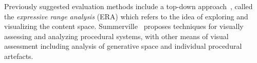 Previously suggested evaluation methods include a top-down approach~, called the \emph{expressive range analysis} (ERA) which refers to the idea of exploring and visualizing the content space. %
Summerville~ proposes %
techniques for visually assessing and analyzing procedural systems, with other means of visual assessment 
including analysis of generative space and individual procedural artefacts. %

